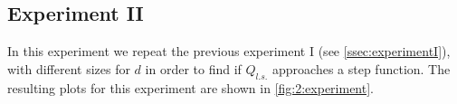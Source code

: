 
\subsection*{Experiment II}

In this experiment we repeat the previous experiment I (see \vref{ssec:experimentI}), with different sizes for $d$ in order to find if $Q_{l.s.}$ approaches a step function. The resulting plots for this experiment are shown in \vref{fig:2:experiment}. 

